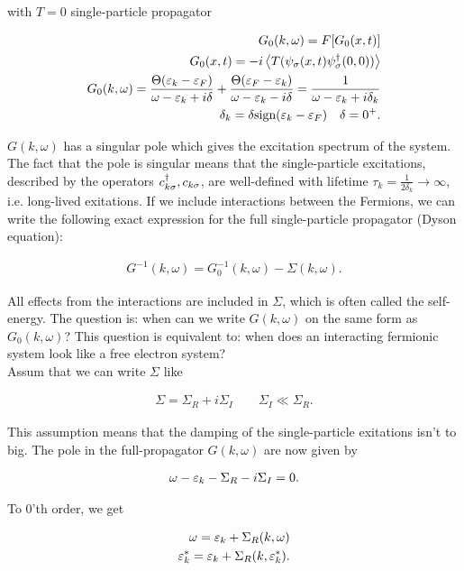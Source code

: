 with $T = 0$ single-particle propagator 

\begin{align*}
    G_0(k,\omega) = F[G_0(x,t)] \\
    G_0(x,t) = -i \expval{T(\psi_\sigma(x,t) \psi^{\dagger}_\sigma(0,0))} \\ 
    G_0(k,\omega) = \frac{\Theta(\varepsilon_k - \varepsilon_F)}{\omega - \varepsilon_k + i\delta} + \frac{\Theta(\varepsilon_F - \varepsilon_k)}{\omega - \varepsilon_k - i\delta} = \frac{1}{\omega - \varepsilon_k +i\delta_k} \\ 
    \delta_k = \delta \text{sign}(\varepsilon_k - \varepsilon_F)  \quad \delta = 0^+.
\end{align*}

$G(k,\omega)$ has a singular pole which gives the excitation spectrum of the system. The fact that the pole is singular means that the single-particle excitations, described by the operators $c^{\dagger}_{k\sigma}, c_{k\sigma}$, are well-defined with lifetime $\tau_k = \frac{1}{2\delta_k} \to \infty$, i.e. long-lived exitations. If we include interactions between the Fermions, we can write the following exact expression for the full single-particle propagator (Dyson equation):

\begin{align*}
    G^{-1}(k,\omega) = G_0^{-1}(k,\omega) - \Sigma(k,\omega). 
\end{align*}

All effects from the interactions are included in $\Sigma$, which is often called the self-energy. The question is: when can we write $G(k,\omega)$ on the same form as $G_0(k,\omega)$? This question is equivalent to: when does an interacting fermionic system look like a free electron system? \\ 

Assum that we can write $\Sigma$ like 

\begin{align*}
    \Sigma = \Sigma_R + i\Sigma_I \quad \quad \Sigma_I \ll \Sigma_R.
\end{align*}

This assumption means that the damping of the single-particle exitations isn't to big. The pole in the full-propagator $G(k,\omega)$ are now given by 

\begin{align*}
    \omega - \varepsilon_k - \Sigma_R - i\Sigma_I = 0.
\end{align*}

To 0'th order, we get 

\begin{align*}
    \omega = \varepsilon_k + \Sigma_R(k,\omega) \\
    \varepsilon_k^* = \varepsilon_k + \Sigma_R(k, \varepsilon_k^*). 
\end{align*}


